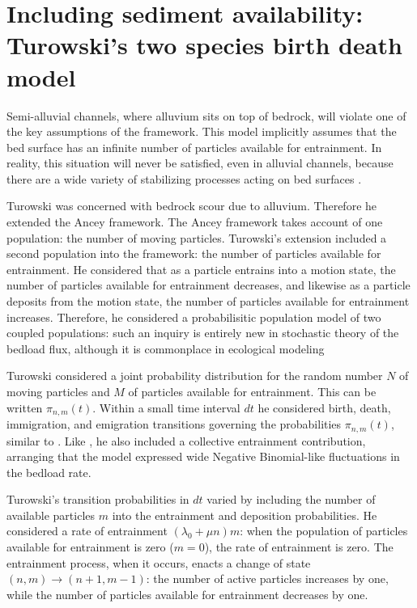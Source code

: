 \section{Including sediment availability: Turowski's two species birth death model} 

Semi-alluvial channels, where alluvium sits on top of bedrock, will violate one of the key assumptions of the \citet{Ancey2008} framework. 
This model implicitly assumes that the bed surface has an infinite number of particles available for entrainment. 
In reality, this situation will never be satisfied, even in alluvial channels, because there are a wide variety of stabilizing processes acting on bed surfaces \citep{Hassan2008, Venditti2016}. 

Turowski was concerned with bedrock scour due to alluvium. 
Therefore he extended the Ancey framework. 
The Ancey framework takes account of one population: the number of moving particles. 
Turowski's extension included a second population into the framework: the number of particles available for entrainment. 
He considered that as a particle entrains into a motion state, the number of particles available for entrainment decreases, and likewise as a particle deposits from the motion state, the number of particles available for entrainment increases. 
Therefore, he considered a probabilisitic population model of two coupled populations: such an inquiry is entirely new in stochastic theory of the bedload flux, although it is commonplace in ecological modeling \citep[e.g.][]{Pielou1977}

Turowski considered a joint probability distribution for the random number $N$ of moving particles and $M$ of particles available for entrainment. 
This can be written $\pi_{n,m}(t)$. 
Within a small time interval $dt$ he considered birth, death, immigration, and emigration transitions governing the probabilities $\pi_{n,m}(t)$, similar to \citet{Ancey2008}. 
Like \citet{Ancey2008}, he also included a collective entrainment contribution, arranging that the model expressed wide Negative Binomial-like fluctuations in the bedload rate. 

Turowski's transition probabilities in $dt$ varied by including the number of available particles $m$ into the entrainment and deposition probabilities. He considered a rate of entrainment $(\lambda_0 + \mu n)m$: when the population of particles available for entrainment is zero ($m=0$), the rate of entrainment is zero. The entrainment process, when it occurs, enacts a change of state $(n,m)\rightarrow(n+1,m-1)$: the number of active particles increases by one, while the number of particles available for entrainment decreases by one. 

